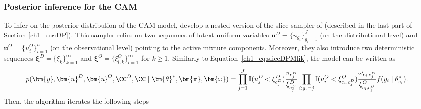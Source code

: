 \subsubsection*{Posterior inference for the CAM}
To infer on the posterior distribution of the CAM model, \textcite{denti2021} develop a nested version of the slice sampler of \textcite{kalli2011} (described in the last part of Section \ref{ch1_sec:DP}). This sampler relies on two sequences of latent uniform variables $\bm{u}^D = \{u_{g_i}\}_{g_i=1}^J$ (on the distributional level) and $\bm{u}^O = \{u^O_i\}_{i=1}^n$ (on the observational level) pointing to the active mixture components. Moreover, they also introduce two deterministic sequences $\bm{\xi}^D = \{\xi_k\}_{k=1}^{\infty}$ and $\bm{\xi}^O = \{\xi_{l,k}^O\}_{l=1}^{\infty}$ for $k\geq 1$.
Similarly to Equation~\ref{ch1_eq:sliceDPMlik}, the model can be written as 
\begin{equation*}
p(\bm{y}, \bm{u}^D, \bm{u}^O, \CC^D, \CC \mid \bm{\theta}^*, \bm{\pi}, \bm{\omega} ) = \prod_{j=1}^J \mathbb{I}(u^D_j < \xi^D_{c^D_j}) \frac{\pi_{c^D_j}}{\xi^D_{c^D_{j}}}  \prod_{i:g_i=j} \mathbb{I}(u_i^O < \xi_{c_i,c^D_j}^O) 
\frac{\omega_{c_i,c^D_j}}{\xi_{c_i,c^D_j}^O}
f(y_i\mid\theta^*_{c_i}).
\end{equation*}
Then, the algorithm iterates the following steps
